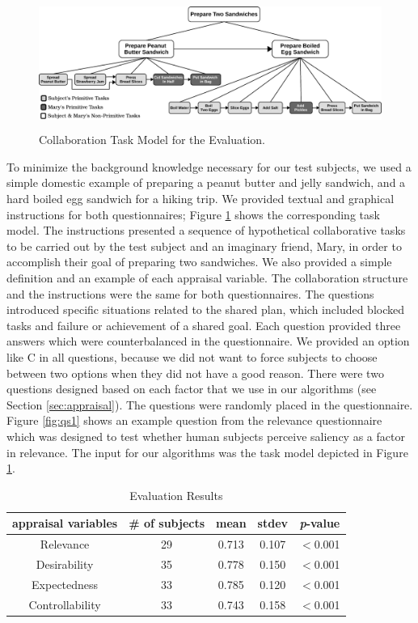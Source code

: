 \begin{figure}[t]
  \centering
  \includegraphics[width=12cm,height=4.25cm]{figure/taskModel-croped.pdf}
  \caption{Collaboration Task Model for the Evaluation.}
  \label{fig:taskModel}
\end{figure}

To minimize the background knowledge necessary for our test subjects, we used a
simple domestic example of preparing a peanut butter and jelly sandwich, and a
hard boiled egg sandwich for a hiking trip. We provided textual and graphical
instructions for both questionnaires; Figure \ref{fig:taskModel} shows the
corresponding task model. The instructions presented a sequence of hypothetical
collaborative tasks to be carried out by the test subject and an imaginary
friend, Mary, in order to accomplish their goal of preparing two sandwiches. We
also provided a simple definition and an example of each appraisal variable. The
collaboration structure and the instructions were the same for both
questionnaires. The questions introduced specific situations related to the
shared plan, which included blocked tasks and failure or achievement of a shared
goal. Each question provided three answers which were counterbalanced in the
questionnaire. We provided an option like C in all questions, because we did not
want to force subjects to choose between two options when they did not have a
good reason. There were two questions designed based on each factor that we use
in our algorithms (see Section \ref{sec:appraisal}). The questions were
randomly placed in the questionnaire. Figure \ref{fig:qs1} shows an example
question from the relevance questionnaire which was designed to test whether
human subjects perceive saliency as a factor in relevance. The input for our
algorithms was the task model depicted in Figure \ref{fig:taskModel}.

\vspace*{-6mm}
\begin{table}[htbp]
\centering
\centering
\caption{Evaluation Results}
\begin{tabular}{|c|c|c|c|c|} \hline
appraisal variables & \# of subjects & mean & stdev & \textit{p}-value\\ \hline 
Relevance &  29 & 0.713 & 0.107 & $<$0.001\\ \hline
Desirability & 35 & 0.778 & 0.150 & $<$0.001\\ \hline 
Expectedness & 33 & 0.785 & 0.120 & $<$0.001\\ \hline 
Controllability & 33 & 0.743 & 0.158 & $<$0.001\\ \hline
\end{tabular}
\label{tbl:statistics}
\end{table}
\vspace*{-4mm}

